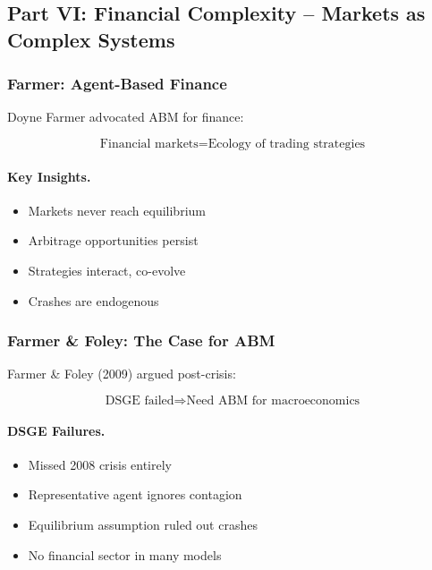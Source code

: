 \subsection{Part VI: Financial Complexity – Markets as Complex Systems}

\subsubsection{Farmer: Agent-Based Finance}

Doyne Farmer advocated ABM for finance:

\begin{equation}
\boxed{
\text{Financial markets} = \text{Ecology of trading strategies}
}
\label{eq:farmer}
\end{equation}

\paragraph{Key Insights.}
\begin{itemize}
    \item Markets never reach equilibrium
    \item Arbitrage opportunities persist
    \item Strategies interact, co-evolve
    \item Crashes are endogenous
\end{itemize}

\subsubsection{Farmer \& Foley: The Case for ABM}

Farmer \& Foley (2009) argued post-crisis:

\begin{equation}
\text{DSGE failed} \Rightarrow \text{Need ABM for macroeconomics}
\end{equation}

\paragraph{DSGE Failures.}
\begin{itemize}
    \item Missed 2008 crisis entirely
    \item Representative agent ignores contagion
    \item Equilibrium assumption ruled out crashes
    \item No financial sector in many models
\end{itemize}

